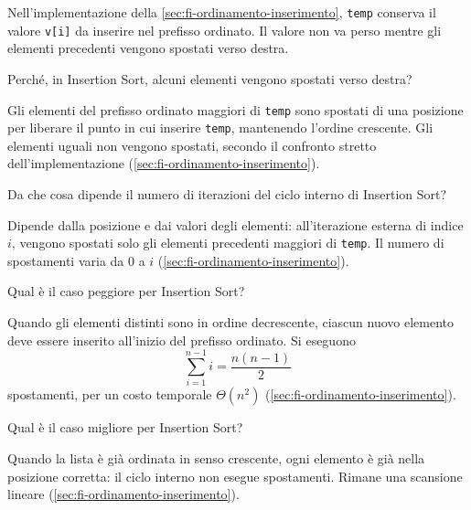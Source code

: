 Nell'implementazione della \cref{sec:fi-ordinamento-inserimento},
\texttt{temp} conserva il valore \lstinline|v[i]| da inserire
nel prefisso ordinato. Il valore non va perso mentre gli
elementi precedenti vengono spostati verso destra.

\begin{exercise}
\label{ex:fi-esercizi-ricerca-ordinamento-inserimento-spostamenti}
Perché, in Insertion Sort, alcuni elementi vengono
spostati verso destra?
\end{exercise}

Gli elementi del prefisso ordinato maggiori di \texttt{temp}
sono spostati di una posizione per liberare il punto in cui
inserire \texttt{temp}, mantenendo l'ordine crescente.
Gli elementi uguali non vengono spostati, secondo il confronto
stretto dell'implementazione
(\cref{sec:fi-ordinamento-inserimento}).

\clearpage

\begin{exercise}
\label{ex:fi-esercizi-ricerca-ordinamento-inserimento-ciclo-interno}
Da che cosa dipende il numero di iterazioni del ciclo interno
di Insertion Sort?
\end{exercise}

Dipende dalla posizione e dai valori degli elementi:
all'iterazione esterna di indice \(i\), vengono spostati
solo gli elementi precedenti maggiori di \texttt{temp}.
Il numero di spostamenti varia da \(0\) a \(i\)
(\cref{sec:fi-ordinamento-inserimento}).

\begin{exercise}
\label{ex:fi-esercizi-ricerca-ordinamento-inserimento-peggiore}
Qual è il caso peggiore per Insertion Sort?
\end{exercise}

Quando gli elementi distinti sono in ordine decrescente,
ciascun nuovo elemento deve essere inserito all'inizio
del prefisso ordinato. Si eseguono
\[
  \sum_{i=1}^{n-1}i=\frac{n(n-1)}2
\]
spostamenti, per un costo temporale \(\Theta(n^2)\)
(\cref{sec:fi-ordinamento-inserimento}).

\begin{exercise}
\label{ex:fi-esercizi-ricerca-ordinamento-inserimento-migliore}
Qual è il caso migliore per Insertion Sort?
\end{exercise}

Quando la lista è già ordinata in senso crescente, ogni
elemento è già nella posizione corretta: il ciclo interno
non esegue spostamenti. Rimane una scansione lineare
(\cref{sec:fi-ordinamento-inserimento}).


